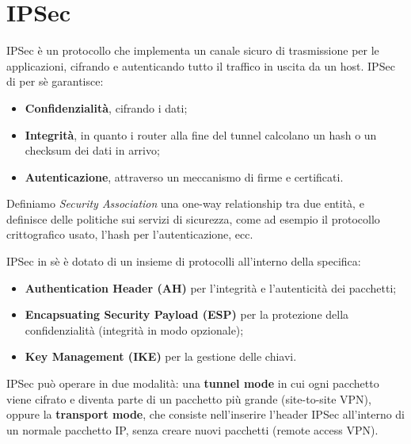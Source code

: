 \documentclass[a4paper, 10pt, twoside]{article}
\begin{document}
	\section{IPSec}
	IPSec è un protocollo che implementa un canale sicuro di trasmissione per le applicazioni, cifrando e autenticando tutto il traffico in uscita da un host. IPSec di per sè garantisce: \begin{itemize}
		\item \textbf{Confidenzialità}, cifrando i dati;
		\item \textbf{Integrità}, in quanto i router alla fine del tunnel calcolano un hash o un checksum dei dati in arrivo;
		\item \textbf{Autenticazione}, attraverso un meccanismo di firme e certificati.
	\end{itemize}

	Definiamo \textit{Security Association} una one-way relationship tra due entità, e definisce delle politiche sui servizi di sicurezza, come ad esempio il protocollo crittografico usato, l'hash per l'autenticazione, ecc.

	IPSec in sè è dotato di un insieme di protocolli all'interno della specifica:\begin{itemize}
		\item \textbf{Authentication Header (AH)} per l'integrità e l'autenticità dei pacchetti;
		\item \textbf{Encapsuating Security Payload (ESP)} per la protezione della confidenzialità (integrità in modo opzionale);
		\item \textbf{Key Management (IKE)} per la gestione delle chiavi.
	\end{itemize}

	IPSec può operare in due modalità: una \textbf{tunnel mode} in cui ogni pacchetto viene cifrato e diventa parte di un pacchetto più grande (site-to-site VPN), oppure la \textbf{transport mode}, che consiste nell'inserire l'header IPSec all'interno di un normale pacchetto IP, senza creare nuovi pacchetti (remote access VPN).
	\vspace{1cm}
\end{document}
